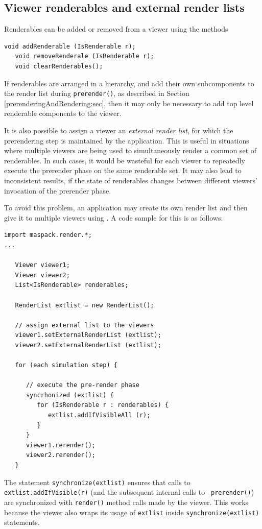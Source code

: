 \subsection{Viewer renderables and external render lists}
\label{viewerRenderables:sec}

Renderables can be added or removed from a viewer using the methods
\begin{lstlisting}[]
   void addRenderable (IsRenderable r);
   void removeRenderale (IsRenderable r);
   void clearRenderables();
\end{lstlisting}

If renderables are arranged in a hierarchy, and add their own
subcomponents to the render list during {\tt prerender()}, as
described in Section \ref{prerenderingAndRendering:sec}, then it may
only be necessary to add top level renderable components to the
viewer.

It is also possible to assign a viewer an {\it external render list},
for which the prerendering step is maintained by the application. This
is useful in situations where multiple viewers are being used to
simultaneously render a common set of renderables. In such cases, it
would be wasteful for each viewer to repeatedly execute the prerender
phase on the same renderable set. It may also lead to inconsistent
results, if the state of renderables changes between different viewers'
invocation of the prerender phase.

To avoid this problem, an application may create its own render list
and then give it to multiple viewers using
.
A code sample for this is as follows:
\begin{lstlisting}[]
import maspack.render.*;
...

   Viewer viewer1;
   Viewer viewer2;
   List<IsRenderable> renderables;

   RenderList extlist = new RenderList();

   // assign external list to the viewers
   viewer1.setExternalRenderList (extlist);
   viewer2.setExternalRenderList (extlist);

   for (each simulation step) {

      // execute the pre-render phase
      syncrhonized (extlist) {
         for (IsRenderable r : renderables) {
            extlist.addIfVisibleAll (r);
         }
      }
      viewer1.rerender();
      viewer2.rerender();
   }
\end{lstlisting}
The statement {\tt synchronize(extlist)} ensures that calls to {\tt
extlist.addIfVisible(r)} (and the subsequent internal calls to {\tt
prerender()}) are synchronized with {\tt render()} method calls made by
the viewer. This works because the viewer also wraps its usage of 
{\tt extlist} inside {\tt synchronize(extlist)} statements.

